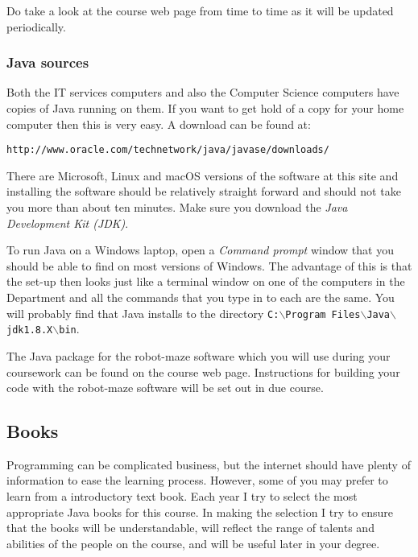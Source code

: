 Do take a look at the course web page from time to time as it will be updated 
periodically. 

\subsubsection{Java sources}

Both the IT services computers and also the Computer Science computers have 
copies of Java running on them. If you want to get hold of a copy for your
home computer then this is very easy. A download can be found at: 

{\tt http://www.oracle.com/technetwork/java/javase/downloads/} 

There are Microsoft, Linux and macOS versions of the software at this site
and installing the software should be relatively straight forward and 
should not take you more than about ten minutes.
Make sure you download the {\em Java Development Kit (JDK)}.
 
To run Java on a Windows laptop, open a {\em Command prompt} window that you 
should be able to find on most versions of Windows. The advantage of this is 
that the set-up then looks just like a terminal window on one of the computers in the 
Department and all the commands that you type in to each are the same. 
You will probably find that Java installs to the directory 
{\tt C:$\backslash$Program Files$\backslash$Java$\backslash$jdk1.8.X$\backslash$bin}.  
 
The Java package for the robot-maze software which you will use during your 
coursework can be found on the course web page. Instructions for building your code
with the robot-maze software will be set out in due course.

\subsection{Books}

Programming can be complicated business, but the internet
should have plenty of information to ease the learning process.
However, some of you may prefer to learn from a introductory text book.
Each year I try to select the most appropriate Java books for this course. 
In making the selection I try to ensure that the books will be understandable,
will reflect the range of talents and abilities of the people on the course,
and will be useful later in your degree. 

